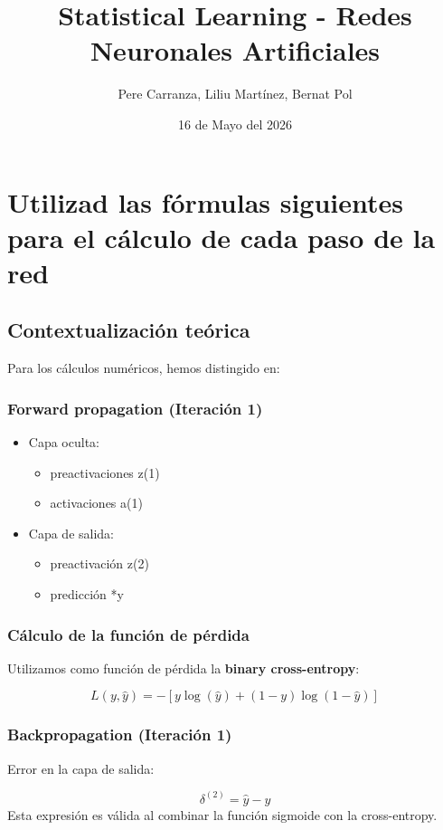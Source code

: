 \documentclass{article}
\title{Statistical Learning - Redes Neuronales Artificiales}
\author{Pere Carranza, Liliu Martínez, Bernat Pol}
\date{16 de Mayo del 2026}
\begin{document}
\maketitle
\section{Utilizad las fórmulas siguientes para el cálculo de cada paso de la red}

\subsection*{Contextualización teórica}

Para los cálculos numéricos, hemos distingido en:
\subsubsection*{Forward propagation (Iteración 1)}
\begin{itemize}
    \item Capa oculta:
    \begin{itemize}
        \item preactivaciones z(1)
        \item activaciones a(1)
\end{itemize}


\item Capa de salida:
\begin{itemize}
    \item preactivación z(2)
    \item predicción *y
\end{itemize}
\end{itemize}

\subsubsection*{Cálculo de la función de pérdida}
Utilizamos como función de pérdida la \textbf{binary cross-entropy}:

\[
L(y, \hat{y}) = -\left[ y \log(\hat{y}) + (1 - y)\log(1 - \hat{y}) \right]
\]

\subsubsection*{Backpropagation (Iteración 1)}
Error en la capa de salida:

\[
\delta^{(2)} = \hat{y} - y
\]
Esta expresión es válida al combinar la función sigmoide con la cross-entropy.
\end{document}
